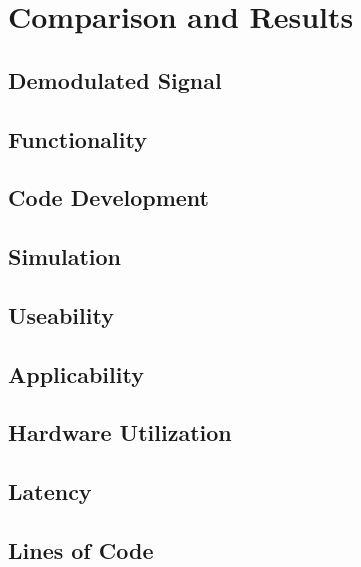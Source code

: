 \chapter{Comparison and Results}
\label{cha:ComparisonAndResults}
  \section{Demodulated Signal}

  \section{Functionality}


  \section{Code Development}

  \section{Simulation}

  \section{Useability}

  \section{Applicability}

  \section{Hardware Utilization}

  \section{Latency}

  \section{Lines of Code}

